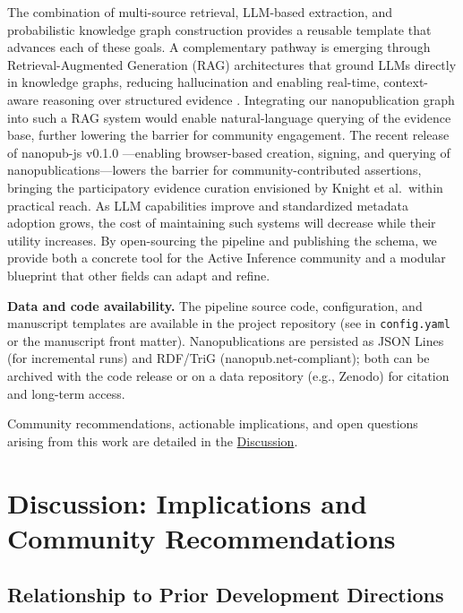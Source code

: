 \documentclass[
  english,
]{article}
\begin{document}
The combination of multi-source retrieval, LLM-based extraction, and
probabilistic knowledge graph construction provides a reusable template
that advances each of these goals. A complementary pathway is emerging
through Retrieval-Augmented Generation (RAG) architectures that ground
LLMs directly in knowledge graphs, reducing hallucination and enabling
real-time, context-aware reasoning over structured evidence
\citep{fan2024survey}. Integrating our nanopublication graph into such a
RAG system would enable natural-language querying of the evidence base,
further lowering the barrier for community engagement. The recent
release of nanopub-js v0.1.0 \citep{kuhn2026nanopubjs}---enabling
browser-based creation, signing, and querying of
nanopublications---lowers the barrier for community-contributed
assertions, bringing the participatory evidence curation envisioned by
Knight et al.~within practical reach. As LLM capabilities improve and
standardized metadata adoption grows, the cost of maintaining such
systems will decrease while their utility increases. By open-sourcing
the pipeline and publishing the schema, we provide both a concrete tool
for the Active Inference community and a modular blueprint that other
fields can adapt and refine.

\textbf{Data and code availability.} The pipeline source code,
configuration, and manuscript templates are available in the project
repository (see  in \texttt{config.yaml} or
the manuscript front matter). Nanopublications are persisted as JSON
Lines (for incremental runs) and RDF/TriG (nanopub.net-compliant); both
can be archived with the code release or on a data repository (e.g.,
Zenodo) for citation and long-term access.

Community recommendations, actionable implications, and open questions
arising from this work are detailed in the
\hyperref[sec:discussion]{Discussion}.

\newpage

\section{Discussion: Implications and Community
Recommendations}\label{sec:discussion}

\subsection{Relationship to Prior Development
Directions}\label{relationship-to-prior-development-directions}
\end{document}
